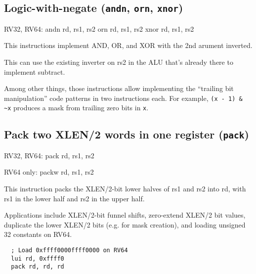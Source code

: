 


\subsection{Logic-with-negate (\texttt{andn}, \texttt{orn}, \texttt{xnor})}

\begin{rvb}
  RV32, RV64:
    andn rd, rs1, rs2
    orn  rd, rs1, rs2
    xnor rd, rs1, rs2
\end{rvb}

This instructions implement AND, OR, and XOR with the 2nd arument inverted.



This can use the existing inverter on rs2 in the ALU that's already there to
implement subtract.

Among other things, those instructions allow implementing the ``trailing bit
manipulation'' code patterns in two instructions each. For example, {\tt (x -
1) \& \textasciitilde{}x} produces a mask from trailing zero bits in {\tt x}.


\subsection{Pack two XLEN/2 words in one register (\texttt{pack})}

\begin{rvb}
  RV32, RV64:
    pack rd, rs1, rs2

  RV64 only:
    packw rd, rs1, rs2
\end{rvb}

This instruction packs the XLEN/2-bit lower halves of rs1 and rs2 into
rd, with rs1 in the lower half and rs2 in the upper half.



Applications include XLEN/2-bit funnel shifts, zero-extend XLEN/2 bit values, duplicate the lower
XLEN/2 bits (e.g. for mask creation), and loading unsigned 32 constants on RV64.

\begin{minipage}{\linewidth}
\begin{verbatim}
  ; Load 0xffff0000ffff0000 on RV64
  lui rd, 0xffff0
  pack rd, rd, rd
\end{verbatim}
\end{minipage}

